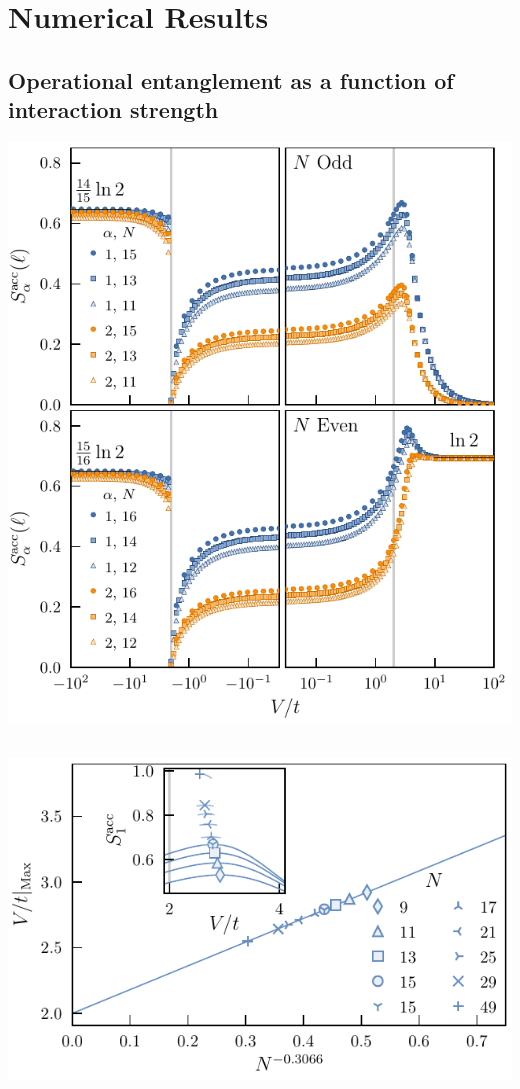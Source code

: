 \section{Numerical Results}
	\subsection{Operational entanglement as a function of interaction strength}
		\includegraphics{operationalEntanglementEntropies_SOP5}
		
	\subsection{}
		\includegraphics{peakScalingOddN.pdf}
		
